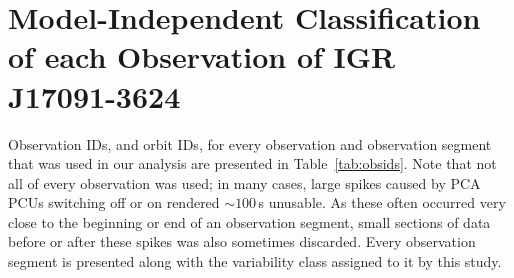 \chapter{Model-Independent Classification of each Observation of IGR J17091-3624}
\label{app:Obsids}

\par Observation IDs, and orbit IDs, for every observation and observation segment that was used in our analysis are presented in Table~\ref{tab:obsids}.  Note that not all of every observation was used; in many cases, large spikes caused by PCA PCUs switching off or on rendered $\sim100$\,s unusable.  As these often occurred very close to the beginning or end of an observation segment, small sections of data before or after these spikes was also sometimes discarded.  Every observation segment is presented along with the variability class assigned to it by this study.

